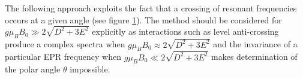 {\color{edired}
The following approach exploits the fact that a crossing of resonant frequencies occurs at a given angle (see figure \ref{fig:resonant_crossing_V2}). The method should be considered for $g\mu_B B_0 \gg 2\sqrt{D^2 + 3E^2}$ explicitly as interactions such as level anti-crossing produce a complex spectra \cite{Degen2008} when $g\mu_B B_0 \approx 2\sqrt{D^2 + 3E^2}$ and the invariance of a particular EPR frequency when $g \mu_B B_0 \ll 2 \sqrt{D^2 + 3E^2}$ makes determination of the polar angle $\theta$ impossible.

\begin{figure}[H]
	\begin{center}
	\end{center}
	\caption{}\label{fig:resonant_crossing_V2}
\end{figure}

}
